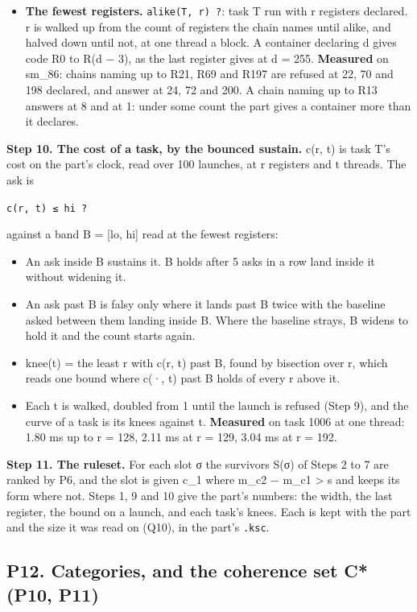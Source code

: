 \begin{itemize}
\item \textbf{The fewest registers.} \texttt{alike(T, r) ?}: task T run with r registers declared. r is walked up from the count of registers the chain names until alike, and halved down until not, at one thread a block. A container declaring d gives code R0 to R(d − 3), as the last register gives at d = 255. \textbf{Measured} on sm\_\allowbreak{}86: chains naming up to R21, R69 and R197 are refused at 22, 70 and 198 declared, and answer at 24, 72 and 200. A chain naming up to R13 answers at 8 and at 1: under some count the part gives a container more than it declares.
\end{itemize}

\textbf{Step 10. The cost of a task, by the bounced sustain.} c(r, t) is task T's cost on the part's clock, read over 100 launches, at r registers and t threads. The ask is

\texttt{c(r, t) ≤ hi ?}

against a band B = [lo, hi] read at the fewest registers:

\begin{itemize}
\item An ask inside B sustains it. B holds after 5 asks in a row land inside it without widening it.
\item An ask past B is falsy only where it lands past B twice with the baseline asked between them landing inside B. Where the baseline strays, B widens to hold it and the count starts again.
\item knee(t) = the least r with c(r, t) past B, found by bisection over r, which reads one bound where c(·, t) past B holds of every r above it.
\item Each t is walked, doubled from 1 until the launch is refused (Step 9), and the curve of a task is its knees against t. \textbf{Measured} on task 1006 at one thread: 1.80 ms up to r = 128, 2.11 ms at r = 129, 3.04 ms at r = 192.
\end{itemize}

\textbf{Step 11. The ruleset.} For each slot σ the survivors S(σ) of Steps 2 to 7 are ranked by P6, and the slot is given c\_\allowbreak{}1 where m\_\allowbreak{}c2 − m\_\allowbreak{}c1 > s and keeps its form where not. Steps 1, 9 and 10 give the part's numbers: the width, the last register, the bound on a launch, and each task's knees. Each is kept with the part and the size it was read on (Q10), in the part's \texttt{.\allowbreak{}ksc}.

\subsection{\texorpdfstring{P12. Categories, and the coherence set C* (P10, P11)}{P12. Categories, and the coherence set C (P10, P11)}}


